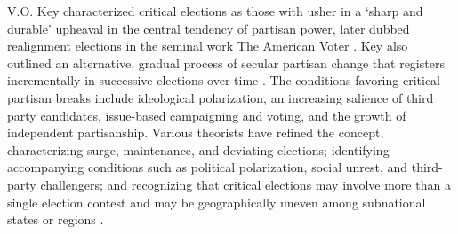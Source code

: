 V.O. Key characterized critical elections as those with usher in a `sharp and durable' upheaval in the central tendency of partisan power, later dubbed realignment elections in the seminal work The American Voter \citep{key_jr_theory_1955, campbell_american_1960}. Key also outlined an alternative, gradual process of secular partisan change that registers incrementally in successive elections over time \citep{key_jr_secular_1959}. The conditions favoring critical partisan breaks include ideological polarization, an increasing salience of third party candidates, issue-based campaigning and voting, and the growth of independent partisanship. Various theorists have refined the concept, characterizing surge, maintenance, and deviating elections; identifying accompanying conditions such as political polarization, social unrest, and third-party challengers; and recognizing that critical elections may involve more than a single election contest and may be geographically uneven among subnational states or regions \citep{sellers_equilibrium_1965, pomper_classification_1967, meffert_realignment_2001, campbell_american_1960, lichtman_critical_1976}. 

